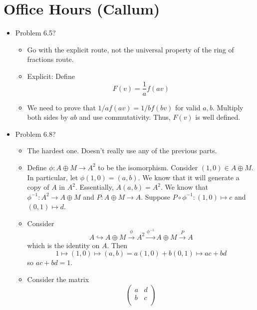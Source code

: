 \documentclass[../notes.tex]{subfiles}
\begin{document}
\section{Office Hours (Callum)}
\begin{itemize}
    \item Problem 6.5?
    \begin{itemize}
        \item Go with the explicit route, not the universal property of the ring of fractions route.
        \item Explicit: Define
        \begin{equation*}
            F(v) = \frac{1}{a}f(av)
        \end{equation*}
        \item We need to prove that $1/af(av)=1/bf(bv)$ for valid $a,b$. Multiply both sides by $ab$ and use commutativity. Thus, $F(v)$ is well defined.
    \end{itemize}
    \item Problem 6.8?
    \begin{itemize}
        \item The hardest one. Doesn't really use any of the previous parts.
        \item Define $\phi:A\oplus M\to A^2$ to be the isomorphism. Consider $(1,0)\in A\oplus M$. In particular, let $\phi(1,0)=(a,b)$. We know that it will generate a copy of $A$ in $A^2$. Essentially, $A(a,b)=A^2$. We know that $\phi^{-1}:A^2\to A\oplus M$ and $P:A\oplus M\to A$. Suppose $P\circ\phi^{-1}:(1,0)\mapsto c$ and $(0,1)\mapsto d$.
        \item Consider
        \begin{equation*}
            A\hookrightarrow A\oplus M\xrightarrow{\phi}A^2\xrightarrow{\phi^{-1}}A\oplus M\xrightarrow{P}A
        \end{equation*}
        which is the identity on $A$. Then
        \begin{equation*}
            1\mapsto (1,0)\mapsto (a,b)=a(1,0)+b(0,1)\mapsto ac+bd
        \end{equation*}
        so $ac+bd=1$.
        \item Consider the matrix
        \begin{equation*}
            \begin{pmatrix}
                a & d\\
                b & c\\
            \end{pmatrix}
        \end{equation*}

\end{itemize}
\end{itemize}
\end{document}
